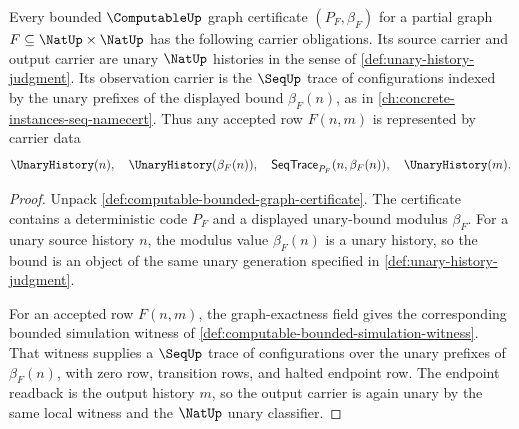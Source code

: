 \begin{theorem}
\label{thm:computable-bounded-graph-source-carrier-obligation}
Every bounded $\ComputableUp$ graph certificate $(P_F,\beta_F)$ for a partial graph $F\subseteq\NatUp\times\NatUp$ has the following carrier obligations. Its source carrier and output carrier are unary $\NatUp$ histories in the sense of \autoref{def:unary-history-judgment}. Its observation carrier is the $\SeqUp$ trace of configurations indexed by the unary prefixes of the displayed bound $\beta_F(n)$, as in \autoref{ch:concrete-instances-seq-namecert}. Thus any accepted row $F(n,m)$ is represented by carrier data
$$
  \UnaryHistory(n),\quad \UnaryHistory(\beta_F(n)),\quad
  \mathsf{SeqTrace}_{P_F}(n,\beta_F(n)),\quad \UnaryHistory(m).
$$
\end{theorem}
\begin{proof}
Unpack \autoref{def:computable-bounded-graph-certificate}. The certificate contains a deterministic code $P_F$ and a displayed unary-bound modulus $\beta_F$. For a unary source history $n$, the modulus value $\beta_F(n)$ is a unary history, so the bound is an object of the same unary generation specified in \autoref{def:unary-history-judgment}.

For an accepted row $F(n,m)$, the graph-exactness field gives the corresponding bounded simulation witness of \autoref{def:computable-bounded-simulation-witness}. That witness supplies a $\SeqUp$ trace of configurations over the unary prefixes of $\beta_F(n)$, with zero row, transition rows, and halted endpoint row. The endpoint readback is the output history $m$, so the output carrier is again unary by the same local witness and the $\NatUp$ unary classifier.
\end{proof}

